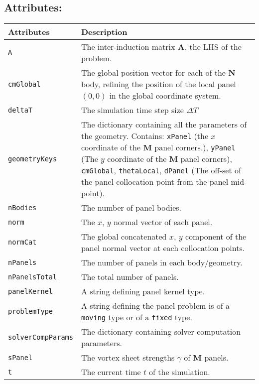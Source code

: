 \subsection*{Attributes:}
\begingroup
\footnotesize
\begin{longtable}{|l|p{12cm}|}
	\hline
	\textbf{Attributes} & \textbf{Description}\\
	\toprule
    \texttt{A} 		& The inter-induction matrix $\mathbf{A}$, the LHS of the problem. \\ \hline
    \texttt{cmGlobal} & The global position vector for each of the $\mathbf{N}$
                       body, refining the position of the local panel $(0,0)$ in the
                       global coordinate system. \\\hline
    \texttt{deltaT} & The simulation time step size $\Delta T$\\ \hline
    \texttt{geometryKeys} & The dictionary containing all the parameters of the geometry. Contains: \texttt{xPanel} (the $x$ coordinate of the $\mathbf{M}$ panel corners.), \texttt{yPanel} (The $y$ coordinate of the $\mathbf{M}$ panel corners), \texttt{cmGlobal}, \texttt{thetaLocal}, \texttt{dPanel} (The off-set of the panel collocation point from the panel mid-point).  \\ \hline
    \texttt{nBodies} & The number of panel bodies.\\\hline
    \texttt{norm} & The $x$, $y$ normal vector of each panel.\\\hline
    \texttt{normCat} & The global concatenated $x$, $y$ component of the panel normal vector at each collocation points.\\          \hline
    \texttt{nPanels} & The number of panels in each body/geometry. \\ \hline
    \texttt{nPanelsTotal} & The total number of panels.\\    \hline      
    \texttt{panelKernel} & A string defining panel kernel type. \\\hline          
    \texttt{problemType} & A string defining the panel problem is of a \texttt{moving} type or of a \texttt{fixed} type.\\ \hline
    \texttt{solverCompParams} & The dictionary containing solver computation parameters.\\          \hline
	\texttt{sPanel} & The vortex sheet strengths $\gamma$ of $\mathbf{M}$ panels. \\          \hline
	\texttt{t} & The current time $t$ of the simulation.\\          \hline

\end{longtable}
